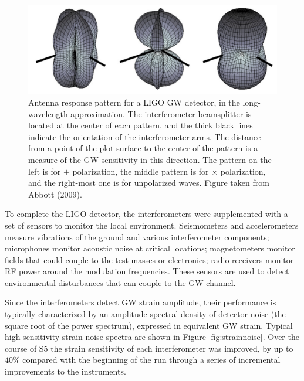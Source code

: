\documentclass[a4paper,10pt]{article}
\begin{document}
\begin{figure}[t]
    \centering
    \includegraphics[width=12cm]{figures/LIGO_PSF.png}
    \caption{\footnotesize{Antenna response pattern for a LIGO GW detector, in the long-wavelength approximation. The interferometer beamsplitter is located at the center of each pattern, and the thick black lines indicate the orientation of the interferometer arms. The distance from a point of the plot surface to the center of the pattern is a measure of the GW sensitivity in this direction. The pattern on the left is for $+$ polarization, the middle pattern is for $\times$ polarization, and the right-most one is for unpolarized waves. Figure taken from Abbott (2009).}}
    \label{fig:ligopsf}
\end{figure}

{\noindent}To complete the LIGO detector, the interferometers were supplemented with a set of sensors to monitor the local environment. Seismometers and accelerometers measure vibrations of the ground and various interferometer components; microphones monitor acoustic noise at critical locations; magnetometers monitor fields that could couple to the test masses or electronics; radio receivers monitor RF power around the modulation frequencies. These sensors are used to detect environmental disturbances that can couple to the GW channel.

{\noindent}Since the interferometers detect GW strain amplitude, their performance is typically characterized by an amplitude spectral density of detector noise (the square root of the power spectrum), expressed in equivalent GW strain. Typical high-sensitivity strain noise spectra are shown in Figure \ref{fig:strainnoise}. Over the course of S5 the strain sensitivity of each interferometer was improved, by up to $40\%$ compared with the beginning of the run through a series of incremental improvements to the instruments.
\end{document}
